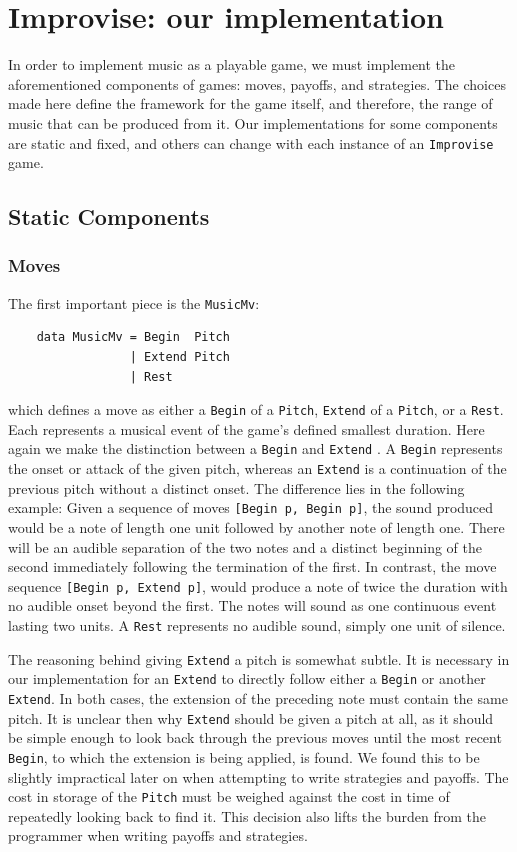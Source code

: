 \documentclass{article}
\begin{document}
\section{Improvise: our
implementation}

In order to implement music as a playable game, we must implement the
aforementioned components of games: moves, payoffs, and strategies. The
choices made here define the framework for the game itself, and
therefore, the range of music that can be produced from it.  Our 
implementations for some components are static and fixed, and others 
can change with each instance of an \texttt{Improvise} game.

\subsection{Static Components}
\subsubsection{Moves}
The first important piece is the \texttt{MusicMv}:

\begin{verbatim}
    data MusicMv = Begin  Pitch
                 | Extend Pitch
                 | Rest
\end{verbatim}

which defines a move as either a \texttt{Begin} of a \texttt{Pitch},
\texttt{Extend} of a \texttt{Pitch}, or a \texttt{Rest}. Each represents
a musical event of the game's defined smallest duration. Here again we make
the distinction between a \texttt{Begin} and \texttt{Extend} . A
\texttt{Begin} represents the onset or attack of the given pitch,
whereas an \texttt{Extend} is a continuation of the previous pitch
without a distinct onset. The difference lies in the following example:
Given a sequence of moves \texttt{{[}Begin p, Begin p{]}}, the sound
produced would be a note of length one unit followed by another note of
length one. There will be an audible separation of the two notes and a
distinct beginning of the second immediately following the termination
of the first. In contrast, the move sequence
\texttt{{[}Begin p, Extend p{]}}, would produce a note of twice the
duration with no audible onset beyond the first. The notes will sound as
one continuous event lasting two units. A \texttt{Rest} represents no
audible sound, simply one unit of silence.

The reasoning behind giving \texttt{Extend} a pitch is somewhat subtle. It is
necessary in our implementation for an \texttt{Extend} to directly
follow either a \texttt{Begin} or another \texttt{Extend}. In both
cases, the extension of the preceding note must contain the same pitch.
It is unclear then why \texttt{Extend} should be given a pitch at all,
as it should be simple enough to look back through the previous moves
until the most recent \texttt{Begin}, to which the extension is being applied, is
found. We found this to be slightly impractical later on when attempting
to write strategies and payoffs. The cost in storage of the
\texttt{Pitch} must be weighed against the cost in time of repeatedly
looking back to find it. This decision also lifts the burden from the
programmer when writing payoffs and strategies.
\end{document}
